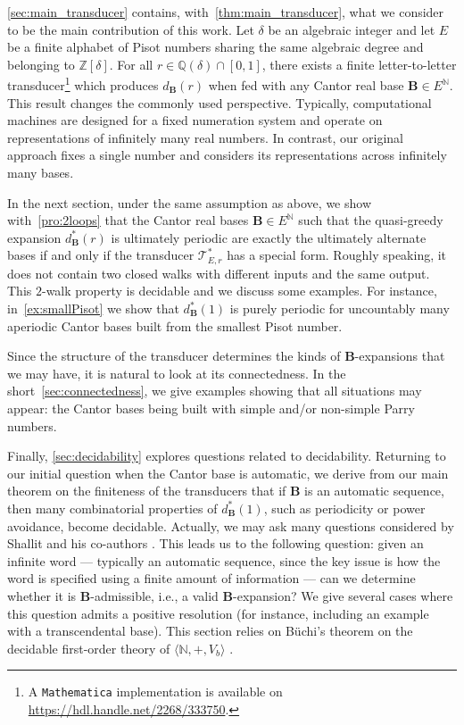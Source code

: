 \documentclass[12pt,reqno]{amsart}
\newcommand{\B}{{\mathbf{B}}}
\begin{document}
\cref{sec:main_transducer} contains, with~\cref{thm:main_transducer}, what we consider to be the main contribution of this work. Let $\delta$ be an algebraic integer and let $E$ be a finite alphabet of Pisot numbers sharing the same algebraic degree and belonging to $\mathbb{Z}[\delta]$. For all $r\in\mathbb{Q}(\delta)\cap [0,1]$, there exists a finite letter-to-letter transducer\footnote{A {\tt Mathematica} implementation is available on \url{https://hdl.handle.net/2268/333750}.} which produces $d_\B(r)$ when fed with any Cantor real base $\B\in E^\mathbb{N}$. This result changes the commonly used perspective. Typically, computational machines are designed for a fixed numeration system and operate on representations of infinitely many real numbers. In contrast, our original approach fixes a single number and considers its representations across infinitely many bases.

In the next section, under the same assumption as above, we show with~\cref{pro:2loops} that the Cantor real bases $\B\in E^\mathbb{N}$ such that the quasi-greedy expansion $d_{\B}^*(r)$ is ultimately periodic are exactly the ultimately alternate bases if and only if the transducer $\mathcal{T}^*_{E,r}$ has a special form. Roughly speaking, it does not contain two closed walks with different inputs and the same output. This $2$-walk property is decidable and we discuss some examples. For instance, in~\cref{ex:smallPisot} we show that $d_\B^*(1)$ is purely periodic for uncountably many aperiodic Cantor bases built from the smallest Pisot number. 

Since the structure of the transducer determines the kinds of $\B$-expansions that we may have, it is natural to look at its connectedness. In the short~\cref{sec:connectedness}, we give examples showing that all situations may appear: the Cantor bases being built with simple and/or non-simple Parry numbers.

Finally, \cref{sec:decidability} explores questions related to decidability. Returning to our initial question when the Cantor base is automatic, we derive from our main theorem on the finiteness of the transducers that if $\B$ is an automatic sequence, then many combinatorial properties of $d_{\B}^*(1)$, such as periodicity or power avoidance, become decidable. Actually, we may ask many questions considered by Shallit and his co-authors \cite{ShallitBook}. This leads us to the following question: given an infinite word --- typically an automatic sequence, since the key issue is how the word is specified using a finite amount of information --- can we determine whether it is $\B$-admissible, i.e., a valid $\B$-expansion? We give several cases where this question admits a positive resolution (for instance, including an example with a transcendental base). This section relies on B\"uchi's theorem on the decidable first-order theory of $\langle\mathbb{N},+,V_b\rangle$ \cite{Buchi1960,ShallitBook}.
\end{document}

